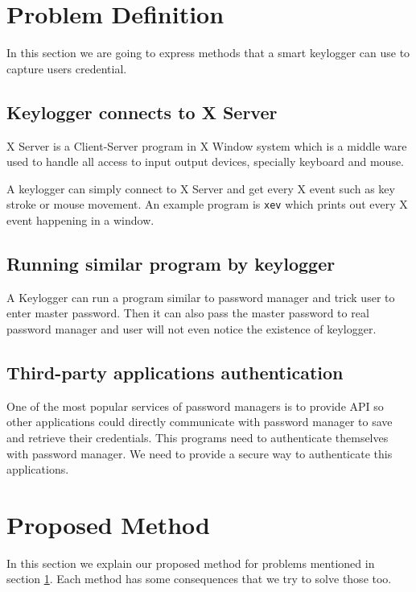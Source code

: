 \documentclass[journal]{IEEEtran}
\begin{document}






\section{Problem Definition}
\label{problems}

In this section we are going to express methods that a smart keylogger can use to capture users credential.  

\subsection{Keylogger connects to X Server}

X Server is a Client-Server program in X Window system which is a middle ware used to handle all access to input output devices, specially keyboard and mouse. 

A keylogger can simply connect to X Server and get every X event such as key stroke or mouse movement. An example program is \texttt{xev} which prints out every X event happening in a window.

\subsection{Running similar program by keylogger}

A Keylogger can run a program similar to password manager and trick user to enter master password. Then it can also pass the master password to real password manager and user will not even notice the existence of keylogger.


\subsection{Third-party applications authentication}

One of the most popular services of password managers is to provide API so other applications could directly communicate with password manager to save and retrieve their credentials. This programs need to authenticate themselves with password manager. We need to provide a secure way to authenticate this applications. 

\section{Proposed Method}

In this section we explain our proposed method for problems mentioned in section \ref{problems}. Each method has some consequences that we try to solve those too.
\end{document}
